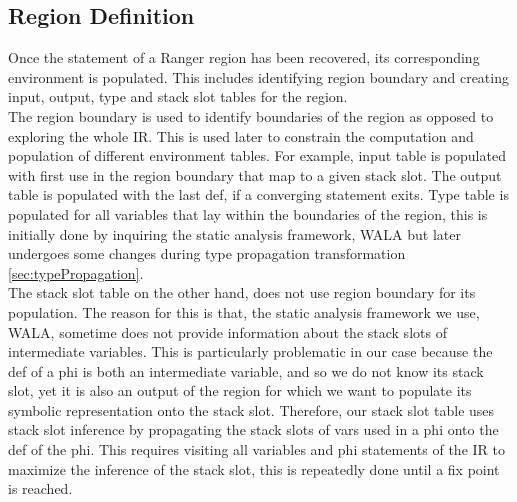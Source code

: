 \subsection{Region Definition}
Once the statement of a Ranger region has been recovered, its corresponding environment is populated. 
%
This includes identifying region boundary and creating input, output, type and stack slot tables for the region.\\
%
The region boundary is used to identify boundaries of the region as opposed to exploring the whole IR. 
%
This is used later to constrain the computation and population of different environment tables. 
%
For example, input table is populated with first use in the region boundary that map to a given stack slot.
%
The output table is populated with the last def, if a converging statement exits. 
%
Type table is populated for all variables that lay within the boundaries of the region, this is initially done by inquiring the static analysis framework, WALA \cite{} but later undergoes some changes during type propagation transformation \ref{sec:typePropagation}.   \\
%
The stack slot table on the other hand, does not use region boundary for its population. 
%
The reason for this is that, the static analysis framework we use, WALA, sometime does not provide information about the stack slots of intermediate variables. 
This is particularly problematic in our case because the def of a phi is both an intermediate variable, and so we do not know its stack slot, yet it is also an output of the region for which we want to populate its symbolic representation onto the stack slot. 
%
Therefore, our stack slot table uses stack slot inference by propagating the stack slots of vars used in a phi onto the def of the phi. 
%
This requires visiting all variables and phi statements of the IR to maximize the inference of the stack slot, this is repeatedly done until a fix point is reached. 
%


